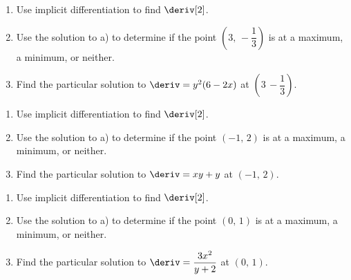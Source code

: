 \begin{enumerate}[label=\hspace{11pt}(\alph*), align=left, leftmargin=*, labelsep=0.25em]
    \item Use implicit differentiation to find $\deriv[2]$.
    \item Use the solution to a) to determine if the point $\left(3, \, -\dfrac{1}{3}\right)$ is at a maximum, a minimum, or neither.
    \item Find the particular solution to $\deriv = y^2(6 - 2x)$ at $\left(3 \, -\dfrac{1}{3}\right)$.
\end{enumerate} \vspace{11pt}

\begin{enumerate}[label=\hspace{11pt}(\alph*), align=left, leftmargin=*, labelsep=0.25em]
    \item Use implicit differentiation to find $\deriv[2]$.
    \item Use the solution to a) to determine if the point $(-1, \, 2)$ is at a maximum, a minimum, or neither.
    \item Find the particular solution to $\deriv = xy + y$ at $(-1, \, 2)$.
\end{enumerate} \vspace{11pt}

\begin{enumerate}[label=\hspace{11pt}(\alph*), align=left, leftmargin=*, labelsep=0.25em]
    \item Use implicit differentiation to find $\deriv[2]$.
    \item Use the solution to a) to determine if the point $(0, \, 1)$ is at a maximum, a minimum, or neither.
    \item Find the particular solution to $\deriv = \dfrac{3x^2}{y + 2}$ at $(0, \, 1)$.
\end{enumerate} \vspace{11pt}

